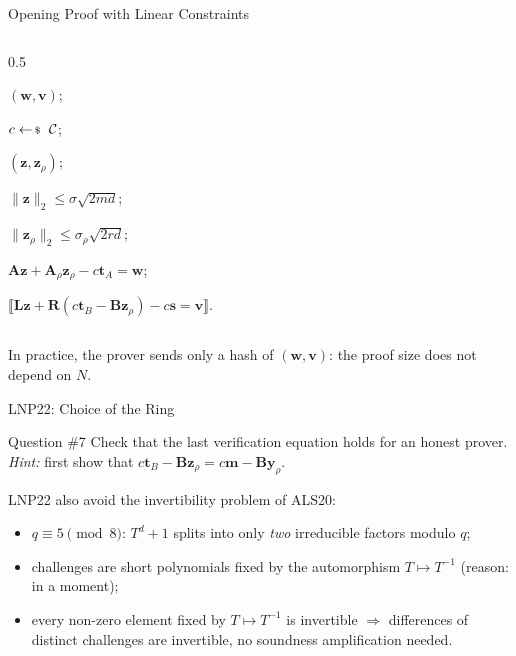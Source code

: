 \documentclass{zkdl-presentation-template}
\begin{document}
\begin{frame}{Opening Proof with Linear Constraints}
\begin{columns}[T]
\begin{column}{0.5\textwidth}
                \begin{algoen}
                    \item {} $(\mathbf{w}, \mathbf{v})$;
                    \item {} $c \leftarrowS \mathcal{C}$;
                    \item {} $(\mathbf{z}, \mathbf{z}_{\rho})$;
                    \item {} $\|\mathbf{z}\|_2 \leq \sigma\sqrt{2md}$;
                    \item {} $\|\mathbf{z}_{\rho}\|_2 \leq \sigma_{\rho}\sqrt{2rd}$;
                    \item {} $\mathbf{A}\mathbf{z} + \mathbf{A}_{\rho}\mathbf{z}_{\rho} - c\mathbf{t}_A = \mathbf{w}$;
                    \item {} $\llbracket \mathbf{L}\mathbf{z} + \mathbf{R}(c\mathbf{t}_B - \mathbf{B}\mathbf{z}_{\rho}) - c\mathbf{s} = \mathbf{v} \rrbracket$.
                \end{algoen}
            \end{column}
        \end{columns}
        \normalsize
        \pause

        \vspace{3pt}
        In practice, the prover sends only a hash of $(\mathbf{w}, \mathbf{v})$: the proof size does not depend on $N$.
    \end{frame}

    \begin{frame}{LNP22: Choice of the Ring}
        \begin{questionblock}{Question \#7}
            Check that the last verification equation holds for an honest prover. \textit{Hint:} first show that $c\mathbf{t}_B - \mathbf{B}\mathbf{z}_{\rho} = c\mathbf{m} - \mathbf{B}\mathbf{y}_{\rho}$.
        \end{questionblock}
        \pause

        LNP22 also avoid the invertibility problem of ALS20:
        \begin{itemize}
            \item $q \equiv 5 \pmod 8$: $T^d+1$ splits into only \emph{two} irreducible factors modulo $q$;\pause
            \item challenges are short polynomials fixed by the automorphism $T \mapsto T^{-1}$ (reason: in a moment);\pause
            \item every non-zero element fixed by $T \mapsto T^{-1}$ is invertible $\Rightarrow$ differences of distinct challenges are invertible, no soundness amplification needed.
        \end{itemize}
    \end{frame}
\end{document}
